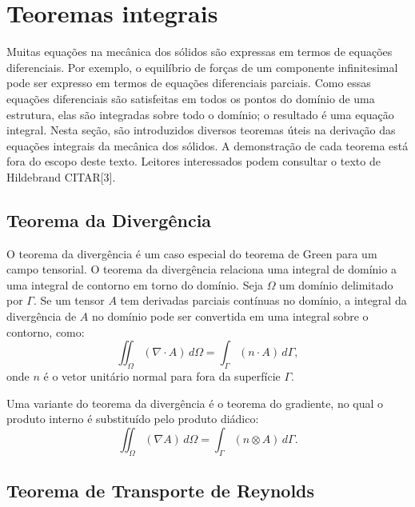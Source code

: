 \section{Teoremas integrais}
{%
	Muitas equações na mecânica dos sólidos são expressas em termos de equações diferenciais. Por exemplo, o equilíbrio de forças de um componente infinitesimal pode ser expresso em termos de equações diferenciais parciais. Como essas equações diferenciais são satisfeitas em todos os pontos do domínio de uma estrutura, elas são integradas sobre todo o domínio; o resultado é uma equação integral. Nesta seção, são introduzidos diversos teoremas úteis na derivação das equações integrais da mecânica dos sólidos. A demonstração de cada teorema está fora do escopo deste texto. Leitores interessados podem consultar o texto de Hildebrand CITAR[3].
	
	\subsection*{Teorema da Divergência}
	
	O teorema da divergência é um caso especial do teorema de Green para um campo tensorial. O teorema da divergência relaciona uma integral de domínio a uma integral de contorno em torno do domínio. Seja $\Omega$ um domínio delimitado por $\Gamma$. Se um tensor $A$ tem derivadas parciais contínuas no domínio, a integral da divergência de $A$ no domínio pode ser convertida em uma integral sobre o contorno, como:
	\begin{equation}
		\iint_\Omega (\nabla \cdot A) \, d\Omega = \int_\Gamma (n \cdot A) \, d\Gamma, \tag{1.28}
	\end{equation}
	onde $n$ é o vetor unitário normal para fora da superfície $\Gamma$. 
	
	Uma variante do teorema da divergência é o teorema do gradiente, no qual o produto interno é substituído pelo produto diádico:
	\begin{equation}
		\iint_\Omega (\nabla A) \, d\Omega = \int_\Gamma (n \otimes A) \, d\Gamma.
	\end{equation}
	
	\subsection*{Teorema de Transporte de Reynolds}
	
}
